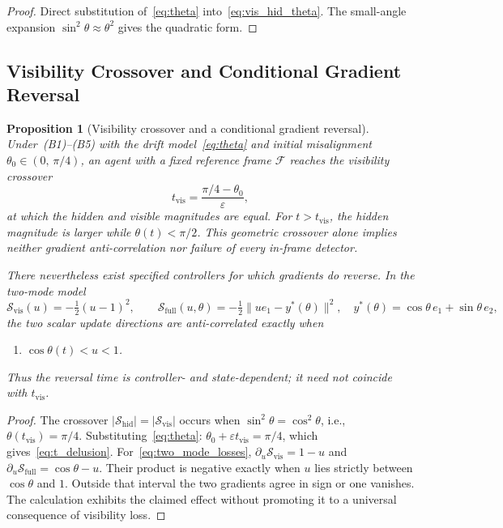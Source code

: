 \documentclass[12pt]{article}
\newtheorem{proposition}[theorem]{Proposition}
\begin{document}
\begin{proof}
Direct substitution of~\eqref{eq:theta}
into~\eqref{eq:vis_hid_theta}.
The small-angle expansion $\sin^2\theta\approx\theta^2$ gives the
quadratic form.
\end{proof}

\subsection{Visibility Crossover and Conditional Gradient Reversal}
\label{subsec:delusion}

\begin{proposition}[Visibility crossover and a conditional gradient reversal]
\label{prop:delusion_model}
Under~\textup{(B1)--(B5)} with the drift
model~\eqref{eq:theta} and initial misalignment
$\theta_0 \in (0,\,\pi/4)$, an agent with a fixed
reference frame $\mathcal{F}$ reaches the visibility crossover
\begin{equation}
\label{eq:t_delusion}
t_{\mathrm{vis}}
= \frac{\pi/4-\theta_0}{\varepsilon},
\end{equation}
at which the hidden and visible magnitudes are equal.  For
$t>t_{\mathrm{vis}}$, the hidden magnitude is larger while
$\theta(t)<\pi/2$.  This geometric crossover alone implies neither
gradient anti-correlation nor failure of every in-frame detector.

There nevertheless exist specified controllers for which gradients do
reverse.  In the two-mode model
\begin{equation}
\label{eq:two_mode_losses}
\mathcal S_{\mathrm{vis}}(u)=-\tfrac12(u-1)^2,
\qquad
\mathcal S_{\mathrm{full}}(u,\theta)
=-\tfrac12\lVert u e_1-y^*(\theta)\rVert^2,
\quad
y^*(\theta)=\cos\theta\,e_1+\sin\theta\,e_2,
\end{equation}
the two scalar update directions are anti-correlated exactly when
\begin{enumerate}
\item[] $\cos\theta(t)<u<1$.
\end{enumerate}
Thus the reversal time is controller- and state-dependent; it need not
coincide with $t_{\mathrm{vis}}$.
\end{proposition}

\begin{proof}
The crossover $|\mathcal{S}_{\mathrm{hid}}|
= |\mathcal{S}_{\mathrm{vis}}|$ occurs when
$\sin^2\theta = \cos^2\theta$, i.e.,
$\theta(t_{\mathrm{vis}}) = \pi/4$.
Substituting~\eqref{eq:theta}:
$\theta_0+\varepsilon t_{\mathrm{vis}} = \pi/4$,
which gives~\eqref{eq:t_delusion}.
For~\eqref{eq:two_mode_losses},
$\partial_u\mathcal S_{\mathrm{vis}}=1-u$ and
$\partial_u\mathcal S_{\mathrm{full}}=\cos\theta-u$.
Their product is negative exactly when $u$ lies strictly between
$\cos\theta$ and $1$.  Outside that interval the two gradients agree
in sign or one vanishes.  The calculation exhibits the claimed effect
without promoting it to a universal consequence of visibility loss.
\end{proof}
\end{document}
